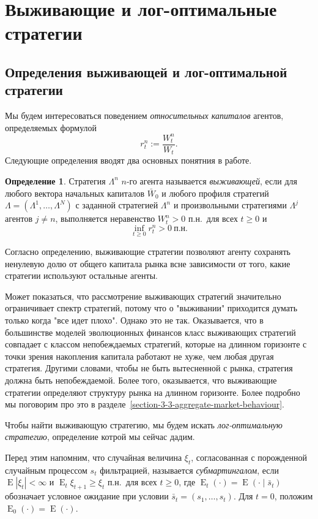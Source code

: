 \documentclass[a4paper,12pt,russian]{article} %
\theoremstyle{definition}
\newtheorem{definition}{Определение}
\DeclareMathOperator{\E}{E}
\begin{document}
\section{Выживающие и лог-оптимальные стратегии}
\label{section3-main-results}


\subsection{Определения выживающей и лог-оптимальной стратегии}
\label{section3-1-def-survival}
Мы будем интересоваться поведением \textit{относительных капиталов} агентов, определяемых формулой
\[
r_t^n := \frac{W_t^n}{W_t}.
\]
Следующие определения вводят два основных понятния в работе.

\begin{definition}
Стратегия $\Lambda^n$ $n$-го агента называется \emph{выживающей}, если для любого вектора начальных капиталов $\bar W_0$ и любого профиля стратегий $\Lambda=(\Lambda^1,\ldots,\Lambda^N)$ с заданной стратегией $\Lambda^n$ и произвольными стратегиями $\Lambda^j$ агентов $j\neq n$, выполняется неравенство $W_t^n > 0$ п.н.\ для всех $t\ge 0$ и 
\[
\inf_{t\ge 0} r_t^n > 0\ \text{п.н.}
\]
\end{definition}

Согласно определению, выживающие стратегии позволяют агенту сохранять ненулевую долю от общего капитала рынка всне зависимости от того, какие стратегии используют остальные агенты.

Может показаться, что рассмотрение выживающих стратегий значительно ограничивает спектр стратегий, потому что о "выживании" приходится думать только когда "все идет плохо". Однако это не так. Оказывается, что в большинстве моделей эволюционных финансов класс выживающих стратегий совпадает с классом непобеждаемых стратегий, которые на длинном горизонте с точки зрения накопления капитала работают не хуже, чем любая другая стратегия. Другими словами, чтобы не быть вытесненной с рынка, стратегия должна быть непобеждаемой. Более того, оказывается, что выживающие стратегии определяют структуру рынка на длинном горизонте. Более подробно мы поговорим про это в разделе~\ref{section-3-3-aggregate-market-behaviour}.



Чтобы найти выживающую стратегию, мы будем искать \emph{лог-оптимальную стратегию}, определение котрой мы сейчас дадим.

Перед этим напомним, что случайная величина $\xi_t$, согласованная с порожденной случайным процессом $s_t$ фильтрацией, называется \emph{субмартингалом}, если $\E|\xi_t| < \infty$ и $\E_t\xi_{t+1} \ge \xi_t$ п.н.\ для всех $t\ge 0$, где $\E_t(\cdot) = \E(\cdot\mid \bar s_t)$ обозначает условное ожидание при условии $\bar s_t=(s_1,\dots,s_t)$.
Для $t=0$, положим $\E_0(\cdot) = \E(\cdot)$.
\end{document}
